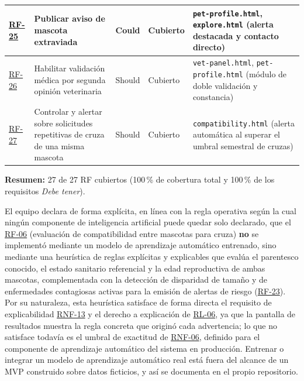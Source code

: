 \documentclass[journal,onecolumn]{IEEEtran}
\begin{document}
\begin{longtable}{@{}p{1.5cm} p{5.2cm} p{1.7cm} p{3.0cm} p{3.4cm}@{}}
		\hline
		\hyperref[tab:RF-25]{RF-25} & Publicar aviso de mascota extraviada & Could & Cubierto & \texttt{pet-profile.html}, \texttt{explore.html} (alerta destacada y contacto directo) \\
		\hline
		\hyperref[tab:RF-26]{RF-26} & Habilitar validación médica por segunda opinión veterinaria & Should & Cubierto & \texttt{vet-panel.html}, \texttt{pet-profile.html} (módulo de doble validación y constancia) \\
		\hline
		\hyperref[tab:RF-27]{RF-27} & Controlar y alertar sobre solicitudes repetitivas de cruza de una misma mascota & Should & Cubierto & \texttt{compatibility.html} (alerta automática al superar el umbral semestral de cruzas) \\
	\end{longtable}
	
	\textbf{Resumen:} 27 de 27 RF cubiertos (100\,\% de cobertura total y
	100\,\% de los requisitos \emph{Debe tener}).

	El equipo declara de forma explícita, en línea con la regla operativa según
	la cual ningún componente de inteligencia artificial puede quedar solo
	declarado, que el \hyperref[tab:RF-06]{RF-06} (evaluación de compatibilidad entre mascotas para
	cruza) \textbf{no} se implementó mediante un modelo de aprendizaje
	automático entrenado, sino mediante una heurística de reglas explícitas y
	explicables que evalúa el parentesco conocido, el estado sanitario
	referencial y la edad reproductiva de ambas mascotas, complementada con la
	detección de disparidad de tamaño y de enfermedades contagiosas activas
	para la emisión de alertas de riesgo (\hyperref[tab:RF-23]{RF-23}). Por su naturaleza, esta
	heurística satisface de forma directa el requisito de explicabilidad
	\hyperref[tab:RNF-13]{RNF-13} y el derecho a explicación de \hyperref[rl:06]{RL-06}, ya que la pantalla de
	resultados muestra la regla concreta que originó cada advertencia; lo que
	no satisface todavía es el umbral de exactitud de \hyperref[tab:RNF-06]{RNF-06}, definido para el
	componente de aprendizaje automático del sistema en producción. Entrenar o
	integrar un modelo de aprendizaje automático real está fuera del alcance de
	un MVP construido sobre datos ficticios, y así se documenta en el propio
	repositorio.
\end{document}
